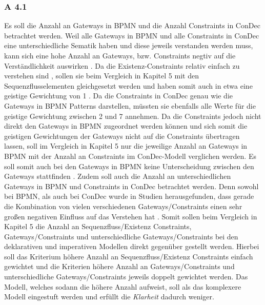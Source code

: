 \subsubsection{A 4.1}
Es soll die Anzahl an Gateways in BPMN und die Anzahl Constraints in ConDec betrachtet werden. Weil alle Gateways in BPMN und alle Constraints in ConDec eine unterschiedliche Sematik haben und diese jeweils verstanden werden muss, kann sich eine hohe Anzahl an Gateways, bzw. Constraints negtiv auf die Verständlichkeit auswirken \cite{gruhn2006adopting, thesis_maja}. \newline
Da die Existenz-Constraints relativ einfach zu verstehen sind \cite{thesis_maja}, sollen sie beim Vergleich in Kapitel 5 mit den Sequenzflusselementen gleichgesetzt werden und haben somit auch in etwa eine geistige Gewichtung von 1 \cite{thesis_maja,haisjackl2014understanding, gruhn2006adopting}. \newline
Da die Constraints in ConDec genau wie die Gateways in BPMN Patterns darstellen, müssten sie ebenfalls alle Werte für die geistige Gewichtung zwischen 2 und 7 annehmen. Da die Constraints jedoch nicht direkt den Gateways in BPMN zugeordnet werden können und sich somit die geistigen Gewichtungen der Gateways nicht auf die Constraints übertragen lassen, soll im Vergleich in Kapitel 5 nur die jeweilige Anzahl an Gateways in BPMN mit der Anzahl an Constraints im ConDec-Modell verglichen werden. Es soll somit auch bei den Gateways in BPMN keine Unterscheidung zwischen den Gateways stattfinden \cite{thesis_maja,haisjackl2014understanding, gruhn2006adopting}. \newline
Zudem soll auch die Anzahl an unterschiedlichen Gateways in BPMN und Constraints in ConDec betrachtet werden. Denn sowohl bei BPMN, als auch bei ConDec wurde in Studien herausgefunden, dass gerade die Kombination von vielen verschiedenen Gateways/Constraints einen sehr großen negativen Einfluss auf das Verstehen hat \cite{gruhn2006adopting, thesis_maja,haisjackl2014understanding}. \newline
Somit sollen beim Vergleich in Kapitel 5 die Anzahl an Sequenzfluss/Existenz Constraints, Gateways/Constraints und unterschiedliche Gateways/Constraints bei den deklarativen und imperativen Modellen direkt gegenüber gestellt werden. Hierbei soll das Kriterium höhere Anzahl an Sequenzfluss/Existenz Constraints einfach gewichtet und die Kriterien höhere Anzahl an Gateways/Constraints und unterschiedliche Gateways/Constraints jeweils doppelt gewichtet werden. Das Modell, welches sodann die höhere Anzahl aufweist, soll als das komplexere Modell eingestuft werden und erfüllt die \textit{Klarheit} dadurch weniger.

